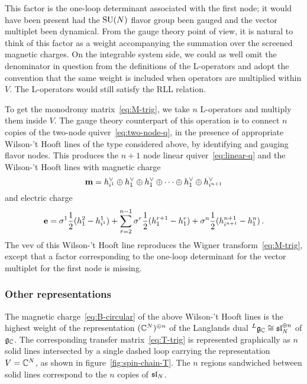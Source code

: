 This factor is the one-loop determinant associated with the first
node; it would have been present had the $\mathrm{SU}(N)$ flavor group been
gauged and the vector multiplet been dynamical.  From the gauge theory
point of view, it is natural to think of this factor as a weight
accompanying the summation over the screened magnetic charges.  On the
integrable system side, we could as well omit the denominator in
question from the definitions of the L-operators and adopt the
convention that the same weight is included when operators are
multiplied within $V$.  The L-operators would still satisfy the RLL
relation.

To get the monodromy matrix~\eqref{eq:M-trig}, we take $n$ L-operators
and multiply them inside $V$.  The gauge theory counterpart of this
operation is to connect $n$ copies of the two-node
quiver~\eqref{eq:two-node-q}, in the presence of appropriate
Wilson-'t Hooft lines of the type considered above, by identifying
and gauging flavor nodes.  This produces the $n+1$ node linear
quiver~\eqref{eq:linear-q} and the Wilson-'t Hooft lines with
magnetic charge
\begin{equation}
  \label{eq:B-linear}
  \mathbf{m}
  =
  h^\vee_{i^1} \oplus h^\vee_1 \oplus h^\vee_1 \oplus \dotsb \oplus h^\vee_1
  \oplus h^\vee_{i^{n+1}}
\end{equation}
and electric charge
\begin{equation}
  \mathbf{e}
  =
  \sigma^1 \frac12 (h_1^2 - h_{i^1}^1)
  + \sum_{r=2}^{n-1} \sigma^r \frac12 (h^{r+1}_1 - h^r_1)
  + \sigma^n \frac12 (h_{i^{n+1}}^{n+1} - h_1^n) \,.
\end{equation}
The vev of this Wilson-'t Hooft line reproduces the Wigner
transform~\eqref{eq:M-trig}, except that a factor corresponding to the
one-loop determinant for the vector multiplet for the first node is
missing.







\subsubsection{Other representations}

The magnetic charge~\eqref{eq:B-circular} of the above Wilson-'t
Hooft lines is the highest weight of the representation
$(\mathbb{C}^N)^{\oplus n}$ of the Langlands dual
${}^L\mathfrak{g}_{\mathbb{C}} \cong \mathfrak{sl}_N^{\oplus n}$ of $\mathfrak{g}_{\mathbb{C}}$.  The corresponding
transfer matrix~\eqref{eq:T-trig} is represented graphically as $n$
solid lines intersected by a single dashed loop carrying the
representation $V = \mathbb{C}^N$, as shown in figure~\ref{fig:spin-chain-T}.
The $n$ regions sandwiched between solid lines correspond to the $n$
copies of $\mathfrak{sl}_N$.

